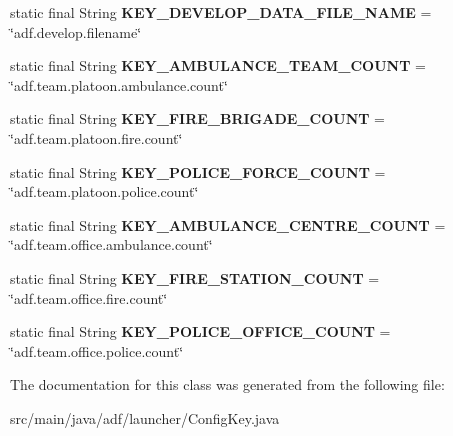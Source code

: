 \begin{DoxyCompactItemize}
\item 
\hypertarget{classadf_1_1launcher_1_1ConfigKey_a6f15b699a23c72a180972aa94a87c1d0}{}\label{classadf_1_1launcher_1_1ConfigKey_a6f15b699a23c72a180972aa94a87c1d0} 
static final String {\bfseries K\+E\+Y\+\_\+\+D\+E\+V\+E\+L\+O\+P\+\_\+\+D\+A\+T\+A\+\_\+\+F\+I\+L\+E\+\_\+\+N\+A\+ME} = \char`\"{}adf.\+develop.\+filename\char`\"{}
\item 
\hypertarget{classadf_1_1launcher_1_1ConfigKey_a83c4e3c1785b5f15d18579123de26c5e}{}\label{classadf_1_1launcher_1_1ConfigKey_a83c4e3c1785b5f15d18579123de26c5e} 
static final String {\bfseries K\+E\+Y\+\_\+\+A\+M\+B\+U\+L\+A\+N\+C\+E\+\_\+\+T\+E\+A\+M\+\_\+\+C\+O\+U\+NT} = \char`\"{}adf.\+team.\+platoon.\+ambulance.\+count\char`\"{}
\item 
\hypertarget{classadf_1_1launcher_1_1ConfigKey_a753cf9e721aefb1eb0daffaaef78e08c}{}\label{classadf_1_1launcher_1_1ConfigKey_a753cf9e721aefb1eb0daffaaef78e08c} 
static final String {\bfseries K\+E\+Y\+\_\+\+F\+I\+R\+E\+\_\+\+B\+R\+I\+G\+A\+D\+E\+\_\+\+C\+O\+U\+NT} = \char`\"{}adf.\+team.\+platoon.\+fire.\+count\char`\"{}
\item 
\hypertarget{classadf_1_1launcher_1_1ConfigKey_af2da4cab9f474b02da3727a596b5aa92}{}\label{classadf_1_1launcher_1_1ConfigKey_af2da4cab9f474b02da3727a596b5aa92} 
static final String {\bfseries K\+E\+Y\+\_\+\+P\+O\+L\+I\+C\+E\+\_\+\+F\+O\+R\+C\+E\+\_\+\+C\+O\+U\+NT} = \char`\"{}adf.\+team.\+platoon.\+police.\+count\char`\"{}
\item 
\hypertarget{classadf_1_1launcher_1_1ConfigKey_a382f104371b41b3f1622f216d4a1eb96}{}\label{classadf_1_1launcher_1_1ConfigKey_a382f104371b41b3f1622f216d4a1eb96} 
static final String {\bfseries K\+E\+Y\+\_\+\+A\+M\+B\+U\+L\+A\+N\+C\+E\+\_\+\+C\+E\+N\+T\+R\+E\+\_\+\+C\+O\+U\+NT} = \char`\"{}adf.\+team.\+office.\+ambulance.\+count\char`\"{}
\item 
\hypertarget{classadf_1_1launcher_1_1ConfigKey_ac2cafe080c33a0235e7b1fd4208d11af}{}\label{classadf_1_1launcher_1_1ConfigKey_ac2cafe080c33a0235e7b1fd4208d11af} 
static final String {\bfseries K\+E\+Y\+\_\+\+F\+I\+R\+E\+\_\+\+S\+T\+A\+T\+I\+O\+N\+\_\+\+C\+O\+U\+NT} = \char`\"{}adf.\+team.\+office.\+fire.\+count\char`\"{}
\item 
\hypertarget{classadf_1_1launcher_1_1ConfigKey_ae89d1a0ee70adf2736e98539cab90b8d}{}\label{classadf_1_1launcher_1_1ConfigKey_ae89d1a0ee70adf2736e98539cab90b8d} 
static final String {\bfseries K\+E\+Y\+\_\+\+P\+O\+L\+I\+C\+E\+\_\+\+O\+F\+F\+I\+C\+E\+\_\+\+C\+O\+U\+NT} = \char`\"{}adf.\+team.\+office.\+police.\+count\char`\"{}
\end{DoxyCompactItemize}


The documentation for this class was generated from the following file\+:\begin{DoxyCompactItemize}
\item 
src/main/java/adf/launcher/Config\+Key.\+java\end{DoxyCompactItemize}
